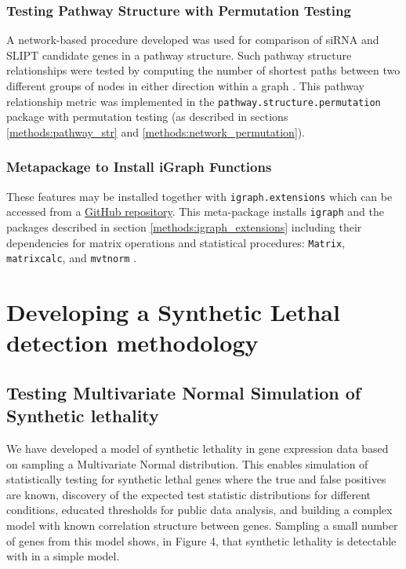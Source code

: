 \subsubsection{Testing Pathway Structure with Permutation Testing}
A network-based procedure developed was used for comparison of siRNA and SLIPT candidate genes in a pathway structure. Such pathway structure relationships were tested by computing the number of shortest paths between two different groups of nodes in either direction within a graph . This pathway relationship metric was implemented in the \texttt{pathway.structure.permutation} package with permutation testing (as described in sections \ref{methods:pathway_str} and \ref{methods:network_permutation}). 

\subsubsection{Metapackage to Install iGraph Functions}
These features may be installed together with \texttt{igraph.extensions} which can be accessed from a \href{https://github.com/TomKellyGenetics/igraph.extensions}{GitHub repository}. This meta-package installs \texttt{igraph} \citep{igraph} and the packages described in section \ref{methods:igraph_extensions} including their dependencies for matrix operations and statistical procedures: \texttt{Matrix}, \texttt{matrixcalc}, and \texttt{mvtnorm} \citep{Matrix, matrixcalc, Genz2009, mvtnorm}.


\iffalse
\section{Developing a Synthetic Lethal detection methodology}

\subsection{Testing Multivariate Normal Simulation of Synthetic lethality}

We have developed a model of synthetic lethality in gene expression data based on sampling a Multivariate Normal distribution.  This enables simulation of statistically testing for synthetic lethal genes where the true and false positives are known, discovery of the expected test statistic distributions for different conditions, educated thresholds for public data analysis, and building a complex model with known correlation structure between genes.  Sampling a small number of genes from this model shows, in Figure 4, that synthetic lethality is detectable with in a simple model.


